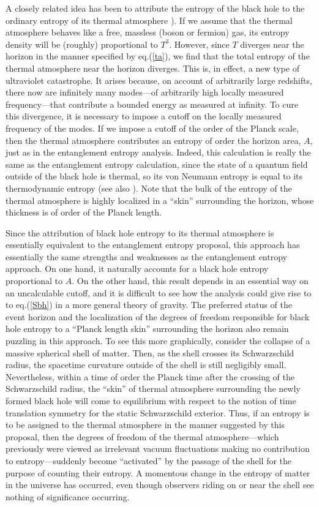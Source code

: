 A closely related idea has been to attribute the entropy of the black
hole to the ordinary entropy of its thermal atmosphere \cite{th}). If
we assume that the thermal atmosphere behaves like a free, massless
(boson or fermion) gas, its entropy density will be (roughly)
proportional to $T^3$. However, since $T$ diverges near the horizon in
the manner specified by eq.(\ref{ta}), we find that the total entropy
of the thermal atmosphere near the horizon diverges.  This is, in
effect, a new type of ultraviolet catastrophe. It arises because, on
account of arbitrarily large redshifts, there now are infinitely many
modes---of arbitrarily high locally measured frequency---that
contribute a bounded energy as measured at infinity.  To cure this
divergence, it is necessary to impose a cutoff on the locally measured
frequency of the modes. If we impose a cutoff of the order of the
Planck scale, then the thermal atmosphere contributes an entropy of
order the horizon area, $A$, just as in the entanglement entropy
analysis. Indeed, this calculation is really the same as the
entanglement entropy calculation, since the state of a quantum field
outside of the black hole is thermal, so its von Neumann entropy is
equal to its thermodynamic entropy (see also \cite{mu}). Note that the bulk
of the entropy of the thermal atmosphere is highly localized in a
``skin'' surrounding the horizon, whose thickness is of order of the
Planck length.

Since the attribution of black hole entropy to its thermal atmosphere
is essentially equivalent to the entanglement entropy proposal, this
approach has essentially the same strengths and weaknesses as the
entanglement entropy approach. On one hand, it naturally accounts for
a black hole entropy proportional to $A$. On the other hand, this
result depends in an essential way on an uncalculable cutoff, and it
is difficult to see how the analysis could give rise to to
eq.(\ref{Sbh}) in a more general theory of gravity. The preferred
status of the event horizon and the localization of the degrees of
freedom responsible for black hole entropy to a ``Planck length skin''
surrounding the horizon also remain puzzling in this approach.  To see
this more graphically, consider the collapse of a massive spherical
shell of matter. Then, as the shell crosses its Schwarzschild radius,
the spacetime curvature outside of the shell is still negligibly
small.  Nevertheless, within a time of order the Planck time after
the crossing of the Schwarzschild radius, the ``skin'' of thermal
atmosphere surrounding the newly formed black hole will come to
equilibrium with respect to the notion of time translation symmetry
for the static Schwarzschild exterior. Thus, if an entropy is to be
assigned to the thermal atmosphere in the manner suggested by this
proposal, then the degrees of freedom of the thermal
atmosphere---which previously were viewed as irrelevant vacuum
fluctuations making no contribution to entropy---suddenly become
``activated'' by the passage of the shell for the purpose of counting
their entropy. A momentous change in the entropy of matter in the
universe has occurred, even though observers riding on or near the
shell see nothing of significance occurring.

